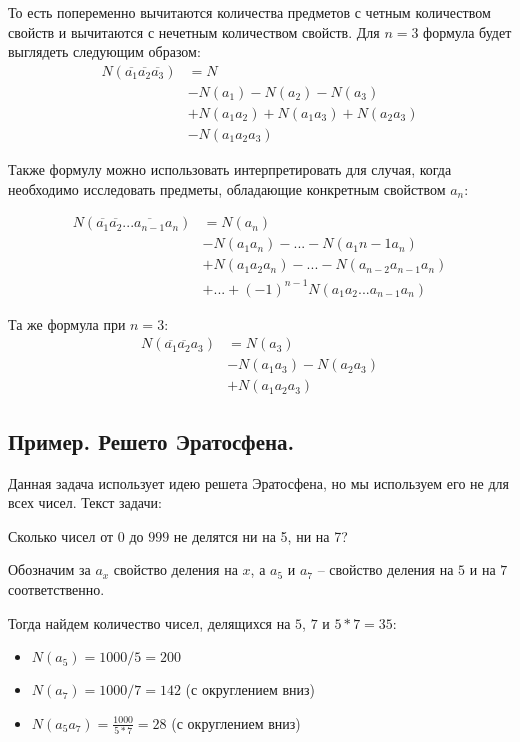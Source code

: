 \documentclass{article}
\begin{document}
То есть попеременно вычитаются количества предметов с четным количеством свойств и вычитаются с нечетным количеством свойств. Для $n = 3$ формула будет выглядеть следующим образом:
\begin{align*}
N(\overline{a_1}\overline{a_2}\overline{a_3}) &= N \\
    &- N(a_1) - N(a_2) - N(a_3) \\
    &+ N(a_1a_2) + N(a_1a_3) + N(a_2a_3) \\
    &- N(a_1a_2a_3) 
\end{align*}

Также формулу можно использовать интерпретировать для случая, когда необходимо исследовать предметы, обладающие конкретным свойством $a_n$:

\begin{align*}
N(\overline{a_1}\overline{a_2}...\overline{a_{n-1}}a_n) &= N(a_n) \\
    &- N(a_1a_n) - ... - N(a_1{n-1}a_n) \\
    &+ N(a_1a_2a_n)  - ... - N(a_{n-2}a_{n-1}a_n)  \\
    &+ ... + (-1)^{n-1}N(a_1a_2...a_{n-1}a_n)
\end{align*}

Та же формула при $n = 3$:
\begin{align*}
N(\overline{a_1}\overline{a_2}a_3) &= N(a_3) \\
    &- N(a_1a_3) - N(a_2a_3) \\
    &+ N(a_1a_2a_3) 
\end{align*}

\subsection{Пример. Решето Эратосфена.}

Данная задача использует идею решета Эратосфена, но мы используем его не для всех чисел. Текст задачи:
\begin{displayquote}
Сколько чисел от $0$ до $999$ не делятся ни на 5, ни на 7?
\end{displayquote} 

Обозначим за $a_x$ свойство деления на $x$, а $a_5$ и $a_7$ -- свойство деления на $5$ и на $7$ соответственно.

Тогда найдем количество чисел, делящихся на $5$, $7$ и $5 * 7 = 35$:
\begin{itemize}
	\item $N(a_5) = 1000 / 5 = 200$
	\item $N(a_7) = 1000 / 7 = 142$ (с округлением вниз)
	\item $N(a_5a_7) = \frac{1000}{5 * 7} = 28$ (с округлением вниз)
\end{itemize} 
\end{document}
